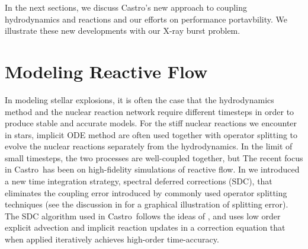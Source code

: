 \documentclass[a4paper]{jpconf}
\newcommand{\castro}{{\sffamily Castro}}
\begin{document}
In the next sections, we discuss \castro's new approach to coupling
hydrodynamics and reactions and our efforts on performance portavbility.
We illustrate these new developments with our X-ray burst problem.

\section{Modeling Reactive Flow}

In modeling stellar explosions, it is often the case that the hydrodynamics method
and the nuclear reaction network require different timesteps in order to produce stable
and accurate models.  For the stiff nuclear reactions we encounter in stars, implicit ODE
method are often used together with operator splitting to evolve the nuclear reactions separately
from the hydrodynamics.  In the limit of small timesteps, the two processes are well-coupled together, but 
The recent focus in \castro\ has been on high-fidelity simulations of
reactive flow.  In \cite{castro:sdc} we introduced a new time
integration strategy, spectral deferred corrections (SDC), that
eliminates the coupling error introduced by commonly used operator
splitting techniques (see the discussion in \cite{astronum:2018} for a
graphical illustration of splitting error).  The SDC algorithm used in
\castro\ follows the ideas of \cite{dutt:2000,minion:2003}, and uses
low order explicit advection and implicit reaction updates in a
correction equation that when applied iteratively achieves high-order
time-accuracy.
\end{document}
